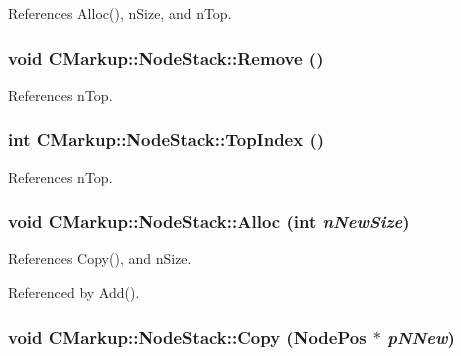 References Alloc(), nSize, and nTop.
\subsubsection[Remove]{\setlength{\rightskip}{0pt plus 5cm}void CMarkup::NodeStack::Remove ()\hspace{0.3cm}{\tt  [inline]}}\label{structCMarkup_1_1NodeStack_4782babbf126c3ff7d3568455e571282}




References nTop.
\subsubsection[TopIndex]{\setlength{\rightskip}{0pt plus 5cm}int CMarkup::NodeStack::TopIndex ()\hspace{0.3cm}{\tt  [inline]}}\label{structCMarkup_1_1NodeStack_4e9aad88e12b7bbabdbb3fd65fc51585}




References nTop.
\subsubsection[Alloc]{\setlength{\rightskip}{0pt plus 5cm}void CMarkup::NodeStack::Alloc (int {\em nNewSize})\hspace{0.3cm}{\tt  [inline, protected]}}\label{structCMarkup_1_1NodeStack_ac640e8a348792b4008057f02a3781ff}




References Copy(), and nSize.

Referenced by Add().
\subsubsection[Copy]{\setlength{\rightskip}{0pt plus 5cm}void CMarkup::NodeStack::Copy ({\bf NodePos} $\ast$ {\em pNNew})\hspace{0.3cm}{\tt  [inline, protected]}}\label{structCMarkup_1_1NodeStack_499a05e053b785df518fb0b6124fd0ee}




